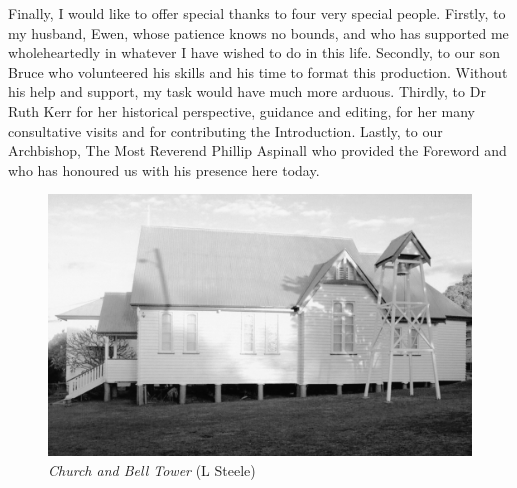 \balance


Finally, I would like to offer special thanks to four very special people. Firstly, to my husband, Ewen, whose patience knows no bounds, and who has supported me wholeheartedly in whatever I have wished to do in this life. Secondly, to our son Bruce who volunteered his skills and his time to format this production. Without his help and support, my task would have much more arduous. Thirdly, to Dr Ruth Kerr for her historical perspective, guidance and editing, for her many consultative visits and for contributing the Introduction. Lastly, to our Archbishop, The Most Reverend Phillip Aspinall who provided the Foreword and who has honoured us with his presence here today.









\begin{figure}[!htb]
\begin{center}
\includegraphics[width=1.\textwidth,center]{../images/churchAndBellTower.jpg}
\caption{{\itshape Church and Bell Tower} {\scriptsize(L Steele)}}
\end{center}
\end{figure}


